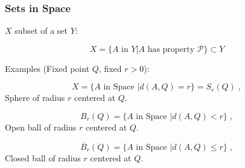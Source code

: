 \begin{frame}
  \frametitle{Sets in Space}

  $X$ subset of a set $Y$:

  $$X = \{ A \text{ in } Y | A \text{ has property } \mathcal{P} \} \subset Y$$

\pause
Examples  (Fixed point $Q$, fixed $r>0$):

$$X = \{ A \text{ in Space } | d(A,Q) = r \} = S_r(Q)\; ,$$
\pause Sphere of radius $r$ centered at $Q$.\pause

$$B_r(Q) = \{ A \text{ in Space } | d(A,Q) <r \} \; ,$$
\pause  Open ball of radius $r$ centered at $Q$. \pause

$$\overline{B}_r(Q) = \{ A \text{ in Space } | d(A,Q) \leqslant r\} \; ,$$
\pause  Closed ball of radius $r$ centered at $Q$.

\end{frame}